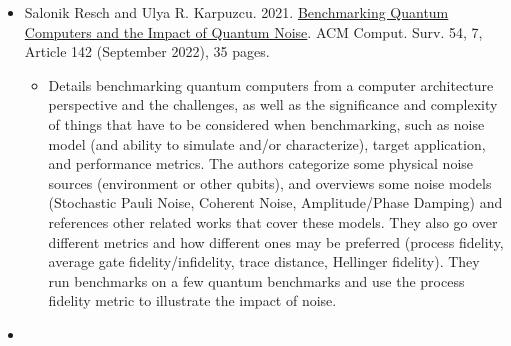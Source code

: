 \documentclass [12pt]{article}
\begin{document}
    \begin{itemize}
        \item Salonik Resch and Ulya R. Karpuzcu. 2021. \href{https://dl-acm-org.ezproxy.library.tufts.edu/doi/10.1145/3464420}{Benchmarking Quantum Computers and the Impact of Quantum Noise}. ACM Comput. Surv. 54, 7, Article 142 (September 2022), 35 pages.
            \begin{itemize}
                \item Details benchmarking quantum computers from a computer architecture perspective and the challenges, as well as the significance and complexity of things that have to be considered when benchmarking, such as noise model (and ability to simulate and/or characterize), target application, and performance metrics. The authors categorize some physical noise sources (environment or other qubits), and overviews some noise models (Stochastic Pauli Noise, Coherent Noise, Amplitude/Phase Damping) and references other related works that cover these models. They also go over different metrics and how different ones may be preferred (process fidelity, average gate fidelity/infidelity, trace distance, Hellinger fidelity). They run benchmarks on a few quantum benchmarks and use the process fidelity metric to illustrate the impact of noise.
            \end{itemize}

        \item 
    \end{itemize}

\end{document}
